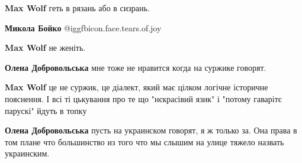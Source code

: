 \begin{itemize} %
 
\textbf{Max Wolf} геть в рязань або в сизрань.

 
\textbf{Микола Бойко}  @igg{fbicon.face.tears.of.joy} 

 
\textbf{Max Wolf} не женіть.

 
\textbf{Олена Добровольська} мне тоже не нравится когда на суржике говорят.

 
\textbf{Max Wolf} це не суржик, це діалект, який має цілком логічне історичне пояснення. І всі ті цькування про те що "нєкрасівий язик" і "потому гаварітє парускі" йдуть в топку

 
\textbf{Олена Добровольська} пусть на украинском говорят, я ж только за. Она права в том плане что большинство из того что мы слышим на улице тяжело назвать украинским.


\end{itemize}
